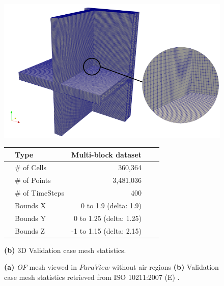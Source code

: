 \begin{figure}[htb]
    \centering
    \begin{minipage}[t]{0.85\columnwidth}
        \centering
        \includegraphics[width=\linewidth]{Figures/mesh3.png}
    \end{minipage}
    \hfill
    \begin{minipage}[t]{0.5\columnwidth}
        \centering
        \begin{tabular}{clrrr}    
            \toprule
            & Type       & Multi-block dataset   \\ \midrule
            & \# of Cells & 360,364                      \\
            & \# of Points                        & 3,481,036                  \\
            & \# of TimeSteps                  & 400                        \\
            & Bounds X          & 0 to 1.9 (delta: 1.9) \\
            & Bounds Y          &                     0 to 1.25 (delta: 1.25) \\
            & Bounds Z          &                     -1 to 1.15 (delta: 2.15)    \\  \bottomrule
        \end{tabular}
        \caption*{\textbf{(b)} 3D Validation case mesh statistics.}
        \label{tab:mesh-stats}
    \end{minipage}
    
    \caption[3D Validation Mesh and Mesh Statistics]{\textbf{(a)} \textit{ \gls{OF}} mesh viewed in $ParaView$ without air regions \textbf{(b)}  Validation case mesh statistics retrieved from ISO 10211:2007 (E) \cite{ISO}.}
    \label{fig:validation-case}
\end{figure}







